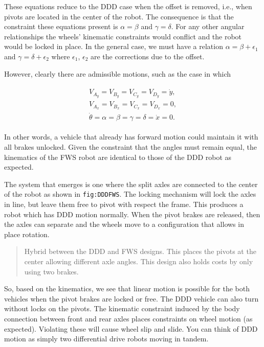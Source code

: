 These equations reduce to the DDD case when the offset is removed, i.e.,
when pivots are located in the center of the robot. The consequence is
that the constraint these equations present is \(\alpha=\beta\) and
\(\gamma = \delta\). For any other angular relationships the wheels'
kinematic constraints would conflict and the robot would be locked in
place. In the general case, we must have a relation
\(\alpha=\beta + \epsilon_1\) and \(\gamma = \delta+ \epsilon_2\) where
\(\epsilon_1\), \(\epsilon_2\) are the corrections due to the offset.

However, clearly there are admissible motions, such as the case in which

\[\begin{aligned}
\begin{array}{l} V_{A_y} = V_{B_y} = V_{C_y} = V_{D_y} = \dot{y},\\[4mm]V_{A_x} = V_{B_x} = V_{C_x} = V_{D_x} = 0, \\[4mm]\dot{\theta} = \alpha = \beta = \gamma = \delta = \dot{x} = 0.\end{array}
\end{aligned}\]

In other words, a vehicle that already has forward motion could maintain
it with all brakes unlocked. Given the constraint that the angles must
remain equal, the kinematics of the FWS robot are identical to those of
the DDD robot as expected.

The system that emerges is one where the split axles are connected to
the center of the robot as shown in \texttt{fig:DDDFWS}. The locking
mechanism will lock the axles in line, but leave them free to pivot with
respect the frame. This produces a robot which has DDD motion normally.
When the pivot brakes are released, then the axles can separate and the
wheels move to a configuration that allows in place rotation.

\begin{quote}
Hybrid between the DDD and FWS designs. This places the pivots at the
center allowing different axle angles. This design also holds costs by
only using two brakes.
\end{quote}

So, based on the kinematics, we see that linear motion is possible for
the both vehicles when the pivot brakes are locked or free. The DDD
vehicle can also turn without locks on the pivots. The kinematic
constraint induced by the body connection between front and rear axles
places constraints on wheel motion (as expected). Violating these will
cause wheel slip and slide. You can think of DDD motion as simply two
differential drive robots moving in tandem.

